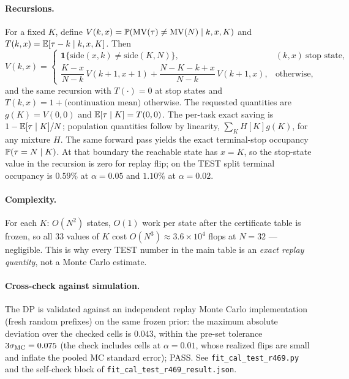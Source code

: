 \paragraph{Recursions.}
For a fixed $K$, define $V(k,x)=\P(\MV(\tau)\neq\MV(N)\mid k,x,K)$
and $T(k,x)=\E[\tau-k\mid k,x,K]$. Then
\[
V(k,x)=
\begin{cases}
\mathbf 1\{\mathrm{side}(x,k)\neq\mathrm{side}(K,N)\}, & (k,x)\ \text{stop state},\\[4pt]
\dfrac{K-x}{N-k}\,V(k+1,x+1)+\dfrac{N-K-k+x}{N-k}\,V(k+1,x), & \text{otherwise},
\end{cases}
\]
and the same recursion with
$T(\cdot)=0$ at stop states and $T(k,x)=1+\text{(continuation mean)}$
otherwise. The requested quantities are $g(K)=V(0,0)$ and
$\E[\tau\mid K]=T(0,0)$. The per-task exact saving is
$1-\E[\tau\mid K]/N$; population quantities follow by linearity,
$\sum_K H[K]g(K)$, for any mixture $H$. The same forward pass yields the
exact terminal-stop occupancy $\P(\tau=N\mid K)$.  At that boundary the
reachable state has $x=K$, so the stop-state value in the recursion is zero
for replay flip; on the TEST split terminal occupancy is $0.59\%$ at
$\alpha=0.05$ and $1.10\%$ at $\alpha=0.02$.

\paragraph{Complexity.}
For each $K$: $O(N^2)$ states, $O(1)$ work per state after the
certificate table is frozen, so all 33 values of $K$ cost
$O(N^3)\approx 3.6\times 10^4$ flops at $N=32$ --- negligible. This is
why every TEST number in the main table is an \emph{exact replay
quantity}, not a Monte Carlo estimate.

\paragraph{Cross-check against simulation.}
The DP is validated against an independent replay Monte Carlo
implementation (fresh random prefixes) on the same frozen prior: the
maximum absolute deviation over the checked cells is $0.043$, within the
pre-set tolerance $3\sigma_{\rm MC}=0.075$ (the check includes cells at
$\alpha=0.01$, whose realized flips are small and inflate the pooled MC
standard error); PASS. See \texttt{fit\_cal\_test\_r469.py} and the
self-check block of \texttt{fit\_cal\_test\_r469\_result.json}.
